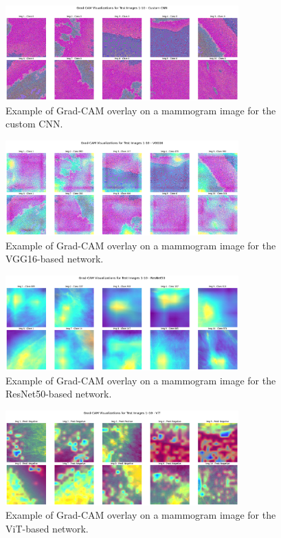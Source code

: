 \documentclass[../main]{subfiles}
\begin{document}
\begin{figure}[h!]
    \centering
    \includegraphics[width=0.8\textwidth]{assets/grad_cam_custom_cnn.png}
    \caption{Example of Grad-CAM overlay on a mammogram image for the custom CNN.}
    \label{fig:grad-cam-custom-cnn}
\end{figure}

\begin{figure}[h!]
    \centering
    \includegraphics[width=0.8\textwidth]{assets/grad_cam_vgg16.png}
    \caption{Example of Grad-CAM overlay on a mammogram image for the VGG16-based network.}
    \label{fig:grad-cam-vgg16}
\end{figure}

\begin{figure}[h!]
    \centering
    \includegraphics[width=0.8\textwidth]{assets/grad_cam_resnet50.png}
    \caption{Example of Grad-CAM overlay on a mammogram image for the ResNet50-based network.}
    \label{fig:grad-cam-resnet50}
\end{figure}

\begin{figure}[h!]
    \centering
    \includegraphics[width=0.8\textwidth]{assets/grad_cam_vit.png}
    \caption{Example of Grad-CAM overlay on a mammogram image for the ViT-based network.}
    \label{fig:grad-cam-vit}
\end{figure}
\end{document}
